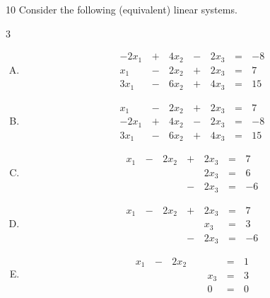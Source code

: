 \begin{applicationActivities}
\begin{activity}{10}
  Consider the following (equivalent) linear systems.
  \begin{multicols}{3}%
  \begin{enumerate}[(A)]
    \item \[
		\begin{alignedat}{4}
   		  -2x_1 &\,+\,& 4x_2 &\,-\,& 2x_3 &\,=\,& -8 \\
   		  x_1 &\,-\,& 2x_2 &\,+\,& 2x_3 &\,=\,& 7 \\
   		  3x_1 &\,-\, & 6x_2 &\,+\,&  4x_3 &\,=\,&  15
   		\end{alignedat}
	\]

    \item \[
		\begin{alignedat}{4}
   		  x_1 &\,-\,& 2x_2 &\,+\,& 2x_3 &\,=\,& 7 \\
   		  -2x_1 &\,+\,& 4x_2 &\,-\,& 2x_3 &\,=\,& -8 \\
   		  3x_1 &\,-\, & 6x_2 &\,+\,&  4x_3 &\,=\,&  15
   		\end{alignedat}
	\]

    \item \[
		\begin{alignedat}{4}
   		  x_1 &\,-\,& 2x_2 &\,+\,& 2x_3 &\,=\,& 7 \\
   		   & &  & & 2x_3 &\,=\,& 6 \\
   		   & & &\,-\,&2x_3 &\,=\,& -6
   		\end{alignedat}
	\]

    \item \[
		\begin{alignedat}{4}
   		  x_1 &\,-\,& 2x_2 &\,+\,& 2x_3 &\,=\,& 7 \\
   		   & &  & & x_3 &\,=\,& 3 \\
   		   & & &\,-\,&2x_3 &\,=\,& -6
   		\end{alignedat}
	\]

    \item \[
		\begin{alignedat}{4}
   		  x_1 &\,-\,& 2x_2 &&  &\,=\,& 1 \\
   		   & &  &\,\,\, & x_3 &\,=\,& 3 \\
   		   & & &&0 &\,=\,& 0
   		\end{alignedat}
	\]


\end{enumerate}
\end{multicols}
\end{activity}
\end{applicationActivities}
